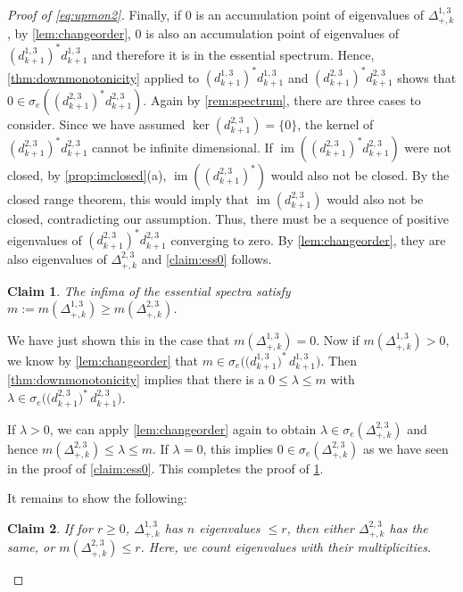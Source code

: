 \documentclass[11pt]{article}
\newtheorem{claim}{Claim}[theorem]
\theoremstyle{definition}
\theoremstyle{remark}
\DeclareMathOperator{\im}{im}
\begin{document}
\begin{proof}[Proof of \cref{eq:upmon2}]
    Finally, if $0$ is an accumulation point of eigenvalues of $\Delta^{1,3}_{+,k}$, by \cref{lem:changeorder}, $0$ is also an accumulation point of eigenvalues of $ (d_{k+1}^{1,3})^* d_{k+1}^{1,3}$ and therefore it is in the essential spectrum. Hence, \cref{thm:downmonotonicity} applied to $(d_{k+1}^{1,3})^* d_{k+1}^{1,3}$ and $(d_{k+1}^{2,3})^* d_{k+1}^{2,3}$ shows that $0 \in \sigma_e((d_{k+1}^{2,3})^* d_{k+1}^{2,3})$. Again by \cref{rem:spectrum}, there are three cases to consider. Since we have assumed $\ker(d_{k+1}^{2,3})=\{0\}$, the kernel of $(d_{k+1}^{2,3})^* d_{k+1}^{2,3}$ cannot be infinite dimensional. If $\im((d_{k+1}^{2,3})^* d_{k+1}^{2,3})$ were not closed, by \cref{prop:imclosed}(a),  $\im((d_{k+1}^{2,3})^*)$ would also not be closed. By the closed range theorem, this would imply that $\im(d_{k+1}^{2,3})$ would also not be closed, contradicting our assumption. Thus, there must be a sequence of positive eigenvalues of $(d_{k+1}^{2,3})^* d_{k+1}^{2,3}$ converging to zero. By \cref{lem:changeorder}, they are also eigenvalues of $\Delta_{+,k}^{2,3}$ and \cref{claim:ess0} follows.
    
    \begin{claim} \label{claim:m_bigeq}
    The infima of the essential spectra satisfy $m:=m(\Delta^{1,3}_{+,k})\ge m(\Delta^{2,3}_{+,k})$.
    \end{claim}
    We have just shown this in the case that $m(\Delta^{1,3}_{+,k})=0$. Now if $m(\Delta^{1,3}_{+,k})>0$, we know by \cref{lem:changeorder} that $m \in \sigma_e\big(\big(d_{k+1}^{1,3}\big)^*\, d_{k+1}^{1,3}\big)$. Then \cref{thm:downmonotonicity} implies that there is a $0\le \lambda \le m$ with $\lambda \in \sigma_e\big(\big(d_{k+1}^{2,3}\big)^*\, d_{k+1}^{2,3}\big)$.
    
    If $\lambda>0$, we can apply \cref{lem:changeorder} again to obtain $\lambda \in \sigma_e(\Delta^{2,3}_{+,k})$ and hence $m(\Delta^{2,3}_{+,k})\le \lambda \le m$. If $\lambda=0$, this implies $0 \in \sigma_e(\Delta^{2,3}_{+,k})$ as we have seen in the proof of \cref{claim:ess0}. This completes the proof of \cref{claim:m_bigeq}.
    
It remains to show the following:

\begin{claim}
If for $r\ge 0$, $\Delta_{+,k}^{1,3}$ has $n$ eigenvalues $\le r$, then either $\Delta_{+,k}^{2,3}$ has the same, or $m(\Delta_{+,k}^{2,3})\le r$. Here, we count eigenvalues with their multiplicities.
\end{claim}


\end{proof}
\end{document}
